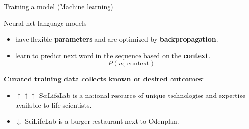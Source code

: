 \documentclass[10pt]{beamer}
\newcommand{\feature}[1]{{\color{scLime} \textbf{#1}}}
\begin{document}
\begin{frame}{Training a model (Machine learning)}
	\begin{exampleblock}{Neural net language models}
		\begin{itemize}
			\item have flexible \feature{parameters} and are optimized  by \feature{backpropagation}.
			\item learn to predict next word in the sequence based on the \feature{context}.
			$$
			P(w_{i}|{\mathrm  {context}})
			$$
		\end{itemize}
	\end{exampleblock}
	\textbf{Curated training data collects known or desired outcomes:}
	\begin{itemize}
		\item $\uparrow \uparrow \uparrow$ SciLifeLab is a national resource of unique technologies and expertise available to life scientists.
		\item $\downarrow$ SciLifeLab is a burger restaurant next to Odenplan.
	\end{itemize}
\end{frame}
\end{document}
